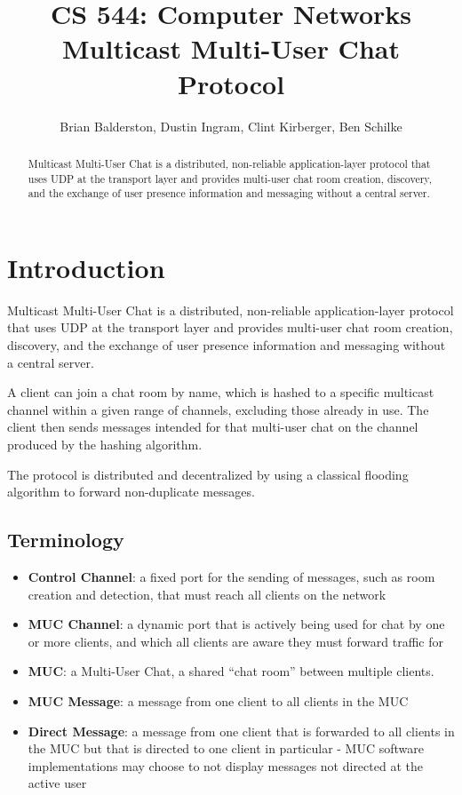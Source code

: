 \documentclass{article}
\title{CS 544: Computer Networks \\ Multicast Multi-User Chat Protocol}
\author{Brian Balderston, Dustin Ingram, Clint Kirberger, Ben Schilke}
\begin{document}
\maketitle
\begin{abstract}
Multicast Multi-User Chat is a distributed, non-reliable application-layer
protocol that uses UDP at the transport layer and provides multi-user chat room
creation, discovery, and the exchange of user presence information and messaging
without a central server. 
\end{abstract}
\section{Introduction}
Multicast Multi-User Chat is a distributed, non-reliable application-layer
protocol that uses UDP at the transport layer and provides multi-user chat room
creation, discovery, and the exchange of user presence information and messaging
without a central server. 

A client can join a chat room by name, which is hashed to a specific multicast
channel within a given range of channels, excluding those already in use. The
client then sends messages intended for that multi-user chat on the channel
produced by the hashing algorithm.

The protocol is distributed and decentralized by using a classical flooding
algorithm to forward non-duplicate messages.

\subsection{Terminology}
\begin{itemize}
\item \textbf{Control Channel}: a fixed port for the sending of messages, such
as room creation and detection, that must reach all clients on the network
\item \textbf{MUC Channel}: a dynamic port that is actively being used for chat
by one or more clients, and which all clients are aware they must forward
traffic for
\item \textbf{MUC}: a Multi-User Chat, a shared ``chat room'' between multiple
clients.
\item \textbf{MUC Message}: a message from one client to all clients in the MUC
\item \textbf{Direct Message}: a message from one client that is forwarded to
all clients in the MUC but that is directed to one client in particular - MUC
software implementations may choose to not display messages not directed at the
active user
\end{itemize}
\end{document}
